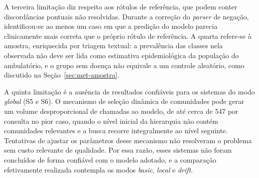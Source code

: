 A terceira limitação diz respeito aos rótulos de referência, que podem conter discordâncias pontuais não resolvidas. Durante a correção do \textit{parser} de negação, identificou-se ao menos um caso em que a predição do modelo parecia clinicamente mais correta que o próprio rótulo de referência. A quarta refere-se à amostra, enriquecida por triagem textual: a prevalência das classes nela observada não deve ser lida como estimativa epidemiológica da população do ambulatório, e o grupo sem doença não equivale a um controle aleatório, como discutido na Seção~\ref{sec:met-amostra}.

A quinta limitação é a ausência de resultados confiáveis para os sistemas do modo \textit{global} (S5 e S6). O mecanismo de seleção dinâmica de comunidades pode gerar um volume desproporcional de chamadas ao modelo, de até cerca de 547 por consulta no pior caso, quando o nível inicial da hierarquia não contém comunidades relevantes e a busca recorre integralmente ao nível seguinte. Tentativas de ajustar os parâmetros desse mecanismo não resolveram o problema sem custo relevante de qualidade. Por essa razão, esses sistemas não foram concluídos de forma confiável com o modelo adotado, e a comparação efetivamente realizada contempla os modos \textit{basic}, \textit{local} e \textit{drift}.

